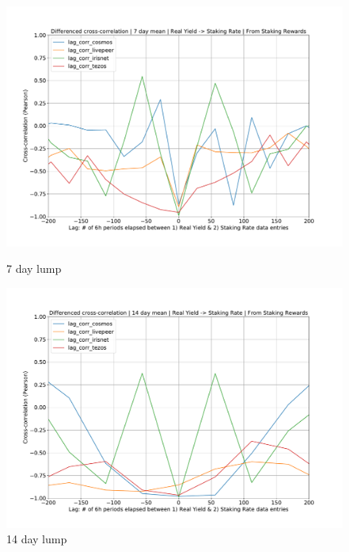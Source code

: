 \documentclass[longbibliography,nofootinbib]{revtex4-1}
\begin{document}
\begin{figure}[h!]
 \centering
    \begin{minipage}{0.5\textwidth}
        \centering
        \includegraphics[width=1\textwidth]{graphs/CrossCorr_SR_DIF_7.pdf}
        \caption{7 day lump}
    \end{minipage}\hfill
    \begin{minipage}{0.5\textwidth}
        \centering
        \includegraphics[width=1\textwidth]{graphs/CrossCorr_SR_DIF_14.pdf}
        \caption{14 day lump}
    \end{minipage}
    \begin{minipage}{0.5\textwidth}
        \centering

\end{minipage}
\end{figure}
\end{document}
